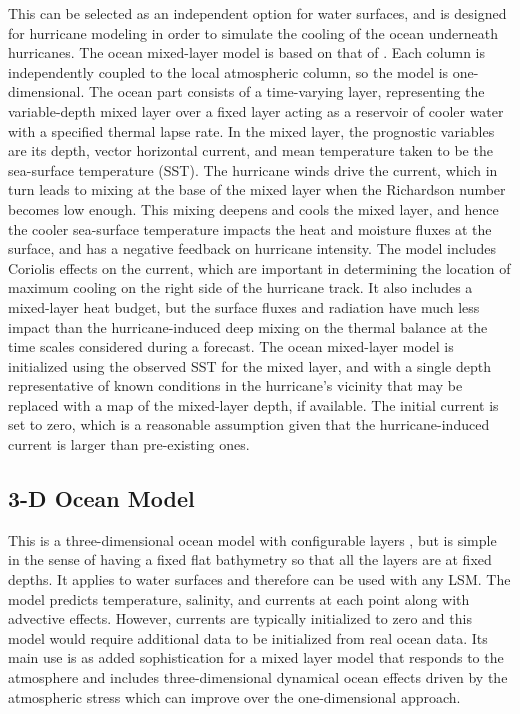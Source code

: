 This can be selected as an independent option for water surfaces, and is designed for
hurricane modeling in order to simulate the cooling of the ocean underneath
hurricanes. The ocean mixed-layer model is based on that of \citet{pollard73}. Each column is independently coupled to the local atmospheric column, so the model is one-dimensional. The ocean part consists of a time-varying layer, representing the variable-depth mixed layer over a fixed layer acting as a reservoir of cooler water with a specified thermal lapse rate. In the mixed layer, the prognostic variables are its depth, vector horizontal current, and mean temperature taken to be the sea-surface temperature (SST). The hurricane winds drive the current, which in turn leads to mixing at the base of the mixed layer when the Richardson number becomes low enough. This mixing deepens and cools the mixed layer, and hence the cooler sea-surface temperature impacts the heat and moisture fluxes at the surface, and has a negative feedback on hurricane intensity. The model includes Coriolis effects on the current, which are important in determining the location of maximum cooling on the right side of the hurricane track. It also includes a mixed-layer heat budget, but the surface fluxes and radiation have much less impact than the hurricane-induced deep mixing on the thermal balance at the time scales considered during a forecast. The ocean mixed-layer model is initialized using the observed SST for the mixed layer, and with a single depth representative of known conditions in the hurricane's vicinity that may be replaced with a map of the mixed-layer depth, if available. The initial current is set to zero, which is a reasonable assumption given that the hurricane-induced current is larger than pre-existing ones.

\subsection{3-D Ocean Model}

This is a three-dimensional ocean model with configurable layers \citep{price94,lee12}, but is simple in the sense of having a fixed flat bathymetry so that all the layers are at fixed depths. It applies to water surfaces and therefore can be used with any LSM.
The model predicts temperature, salinity, and currents at each point along with advective effects. However, currents are typically initialized to zero and this model would
require additional data to be initialized from real ocean data. Its main use is as added sophistication for a mixed layer model that responds to the atmosphere and includes
three-dimensional dynamical ocean effects driven by the atmospheric stress which can improve over the one-dimensional approach.

